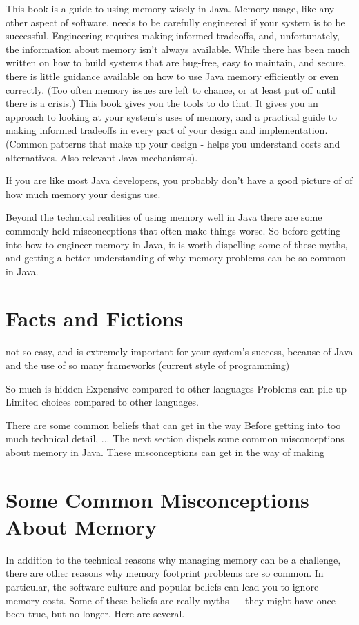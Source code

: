 This book is a guide to using memory wisely in Java. Memory usage, like any other
aspect of software, needs to be carefully engineered if your system is to be successful.
Engineering requires making informed tradeoffs, and, unfortunately, the information
about memory isn't always available. 
While there has been much written on how to build systems that are bug-free, easy to maintain, and secure,
there is little guidance available on how to use Java memory efficiently
or even correctly. (Too often memory issues are left to chance, or at least
put off until there is a crisis.)  This book gives you the tools to do that.
It gives you 
an approach to looking at your system's uses of memory, and a practical guide
to making informed tradeoffs in every part of your design and
implementation.  (Common patterns that make up your design - helps you understand costs and alternatives.  Also 
relevant Java mechanisms).

If you are like most Java developers, you probably don't have a good picture of
of how much memory your designs use.

Beyond the technical realities of using memory well in Java there are some commonly held misconceptions that often make things worse. So before getting into how to engineer memory in Java, it is worth dispelling some
of these myths, and getting a better understanding of why memory problems
can be so common in Java.

\section{Facts and Fictions}

not so easy, and is extremely important for your system's success, because of Java and the use of so
many frameworks (current style of programming)

So much is hidden
Expensive compared to other languages
Problems can pile up
Limited choices compared to other languages.


There are some common beliefs that can get in the way 
Before getting into too much technical detail, ... The next section dispels some common misconceptions about memory in Java.  These misconceptions can get in the way of making 


\section{Some Common Misconceptions About Memory}

In addition to the technical reasons why managing memory can be a challenge, there
are other reasons why memory footprint problems are so common. In particular,
the software culture and popular beliefs can lead you to ignore memory
costs. Some of these beliefs are really myths --- they might have once
been true, but no longer. Here are several.

